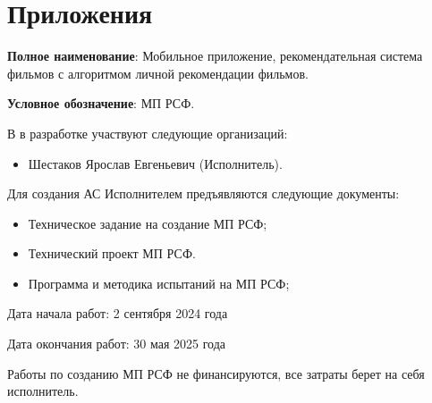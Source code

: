 \chapter*{Приложения}






\textbf{Полное наименование}:
Мобильное приложение, рекомендательная система фильмов с алгоритмом личной рекомендации фильмов.

\textbf{Условное обозначение}: МП РСФ.


В в разработке участвуют следующие организаций:

\begin{itemize}
	\item Шестаков Ярослав Евгеньевич (Исполнитель).
\end{itemize}


Для создания АС Исполнителем предъявляются следующие документы:

\begin{itemize}
	\item Техническое задание на создание МП РСФ;
	\item Технический проект МП РСФ.
	\item Программа и методика испытаний на МП РСФ;
\end{itemize}


Дата начала работ: 2 сентября 2024 года

Дата окончания работ: 30 мая 2025 года


Работы по созданию МП РСФ не финансируются, все затраты берет на себя исполнитель.

